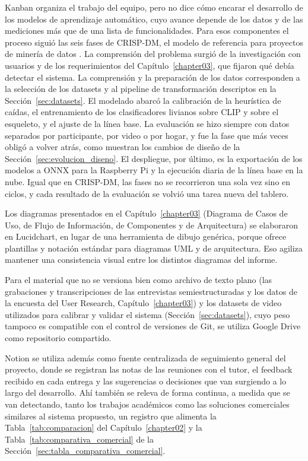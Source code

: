 Kanban organiza el trabajo del equipo, pero no dice cómo encarar el desarrollo de los modelos de aprendizaje automático, cuyo avance depende de los datos y de las mediciones más que de una lista de funcionalidades.
Para esos componentes el proceso siguió las seis fases de CRISP-DM, el modelo de referencia para proyectos de minería de datos \parencite{Chapman2000, Wirth2000}.
La comprensión del problema surgió de la investigación con usuarios y de los requerimientos del Capítulo~\ref{chapter03}, que fijaron qué debía detectar el sistema.
La comprensión y la preparación de los datos corresponden a la selección de los datasets y al pipeline de transformación descriptos en la Sección~\ref{sec:datasets}.
El modelado abarcó la calibración de la heurística de caídas, el entrenamiento de los clasificadores livianos sobre CLIP y sobre el esqueleto, y el ajuste de la línea base.
La evaluación se hizo siempre con datos separados por participante, por video o por hogar, y fue la fase que más veces obligó a volver atrás, como muestran los cambios de diseño de la Sección~\ref{sec:evolucion_diseno}.
El despliegue, por último, es la exportación de los modelos a ONNX para la Raspberry Pi y la ejecución diaria de la línea base en la nube.
Igual que en CRISP-DM, las fases no se recorrieron una sola vez sino en ciclos, y cada resultado de la evaluación se volvió una tarea nueva del tablero.

Los diagramas presentados en el Capítulo~\ref{chapter03} (Diagrama de Casos de Uso, de Flujo de Información, de Componentes y de Arquitectura) se elaboraron en Lucidchart, en lugar de una herramienta de dibujo genérica, porque ofrece plantillas y notación estándar para diagramas UML y de arquitectura.
Eso agiliza mantener una consistencia visual entre los distintos diagramas del informe.

Para el material que no se versiona bien como archivo de texto plano (las grabaciones y transcripciones de las entrevistas semiestructuradas y los datos de la encuesta del User Research, Capítulo~\ref{chapter03}) y los datasets de video utilizados para calibrar y validar el sistema (Sección~\ref{sec:datasets}), cuyo peso tampoco es compatible con el control de versiones de Git, se utiliza Google Drive como repositorio compartido.

Notion se utiliza además como fuente centralizada de seguimiento general del proyecto, donde se registran las notas de las reuniones con el tutor, el feedback recibido en cada entrega y las sugerencias o decisiones que van surgiendo a lo largo del desarrollo.
Ahí también se releva de forma continua, a medida que se van detectando, tanto los trabajos académicos como las soluciones comerciales similares al sistema propuesto, un registro que alimenta la Tabla~\ref{tab:comparacion} del Capítulo~\ref{chapter02} y la Tabla~\ref{tab:comparativa_comercial} de la Sección~\ref{sec:tabla_comparativa_comercial}.

